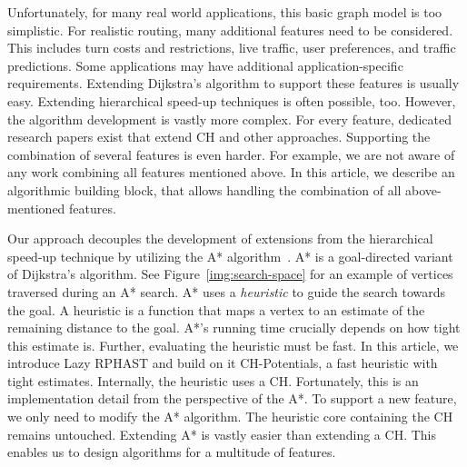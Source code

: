 \documentclass[manuscript,review]{acmart}
\begin{document}
Unfortunately, for many real world applications, this basic graph model is too simplistic.
For realistic routing, many additional features need to be considered.
This includes turn costs and restrictions, live traffic, user preferences, and traffic predictions. %
Some applications may have additional application-specific requirements.
Extending Dijkstra's algorithm to support these features is usually easy.
Extending hierarchical speed-up techniques is often possible, too.
However, the algorithm development is vastly more complex. %
For every feature, dedicated research papers exist that extend CH and other approaches.
Supporting the combination of several features is even harder.
For example, we are not aware of any work combining all features mentioned above.
In this article, we describe an algorithmic building block, that allows handling the combination of all above-mentioned features.

Our approach decouples the development of extensions from the hierarchical speed-up technique by utilizing the A* algorithm~\cite{hnr-afbhd-68}.
A* is a goal-directed variant of Dijkstra's algorithm.
See Figure~\ref{img:search-space} for an example of vertices traversed during an A* search.
A* uses a \emph{heuristic} to guide the search towards the goal.
A heuristic is a function that maps a vertex to an estimate of the remaining distance to the goal.
A*'s running time crucially depends on how tight this estimate is.
Further, evaluating the heuristic must be fast.
In this article, we introduce Lazy RPHAST and build on it CH-Potentials, a fast heuristic with tight estimates.
Internally, the heuristic uses a CH.
Fortunately, this is an implementation detail from the perspective of the A*.
To support a new feature, we only need to modify the A* algorithm.
The heuristic core containing the CH remains untouched.
Extending A* is vastly easier than extending a CH.
This enables us to design algorithms for a multitude of features.
\end{document}
